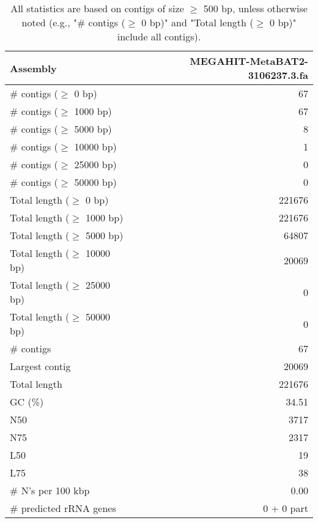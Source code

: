 \documentclass[12pt,a4paper]{article}
\begin{document}
\begin{table}[ht]
\begin{center}
\caption{All statistics are based on contigs of size $\geq$ 500 bp, unless otherwise noted (e.g., "\# contigs ($\geq$ 0 bp)" and "Total length ($\geq$ 0 bp)" include all contigs).}
\begin{tabular}{|l*{1}{|r}|}
\hline
Assembly & MEGAHIT-MetaBAT2-3106237.3.fa \\ \hline
\# contigs ($\geq$ 0 bp) & 67 \\ \hline
\# contigs ($\geq$ 1000 bp) & 67 \\ \hline
\# contigs ($\geq$ 5000 bp) & 8 \\ \hline
\# contigs ($\geq$ 10000 bp) & 1 \\ \hline
\# contigs ($\geq$ 25000 bp) & 0 \\ \hline
\# contigs ($\geq$ 50000 bp) & 0 \\ \hline
Total length ($\geq$ 0 bp) & 221676 \\ \hline
Total length ($\geq$ 1000 bp) & 221676 \\ \hline
Total length ($\geq$ 5000 bp) & 64807 \\ \hline
Total length ($\geq$ 10000 bp) & 20069 \\ \hline
Total length ($\geq$ 25000 bp) & 0 \\ \hline
Total length ($\geq$ 50000 bp) & 0 \\ \hline
\# contigs & 67 \\ \hline
Largest contig & 20069 \\ \hline
Total length & 221676 \\ \hline
GC (\%) & 34.51 \\ \hline
N50 & 3717 \\ \hline
N75 & 2317 \\ \hline
L50 & 19 \\ \hline
L75 & 38 \\ \hline
\# N's per 100 kbp & 0.00 \\ \hline
\# predicted rRNA genes & 0 + 0 part \\ \hline
\end{tabular}
\end{center}
\end{table}
\end{document}
